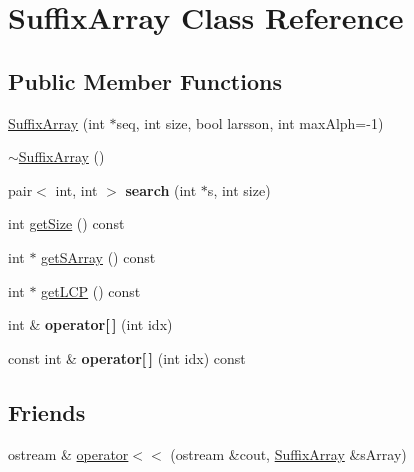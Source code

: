 \hypertarget{classSuffixArray}{\section{Suffix\-Array Class Reference}
\label{classSuffixArray}
}
\subsection*{Public Member Functions}
\begin{DoxyCompactItemize}
\item 
\hyperlink{classSuffixArray_a83235ab312aea1c50ab3a616c85ae405}{Suffix\-Array} (int $\ast$seq, int size, bool larsson, int max\-Alph=-\/1)
\item 
\hyperlink{classSuffixArray_a6493c8516e4b76cce6fe0bfca47b13b0}{$\sim$\-Suffix\-Array} ()
\item 
\hypertarget{classSuffixArray_a1886977617bfc4c9cb7d6c643ebb0696}{pair$<$ int, int $>$ {\bfseries search} (int $\ast$s, int size)}\label{classSuffixArray_a1886977617bfc4c9cb7d6c643ebb0696}

\item 
int \hyperlink{classSuffixArray_a42c1557b2ad51886208dcf74b200e276}{get\-Size} () const 
\item 
int $\ast$ \hyperlink{classSuffixArray_a9f702b7c059a694cad1c776dd90b637a}{get\-S\-Array} () const 
\item 
int $\ast$ \hyperlink{classSuffixArray_a4ec9f2035ee2a6ed06ccbba58165c7e2}{get\-L\-C\-P} () const 
\item 
\hypertarget{classSuffixArray_a3a714f4d1d641c769b75957ef4f6c083}{int \& {\bfseries operator\mbox{[}$\,$\mbox{]}} (int idx)}\label{classSuffixArray_a3a714f4d1d641c769b75957ef4f6c083}

\item 
\hypertarget{classSuffixArray_a4b20c30605bb5244ff8efb02f53686d8}{const int \& {\bfseries operator\mbox{[}$\,$\mbox{]}} (int idx) const }\label{classSuffixArray_a4b20c30605bb5244ff8efb02f53686d8}

\end{DoxyCompactItemize}
\subsection*{Friends}
\begin{DoxyCompactItemize}
\item 
ostream \& \hyperlink{classSuffixArray_a79797b488f2191d1fef54a6eb01dce3f}{operator$<$$<$} (ostream \&cout, \hyperlink{classSuffixArray}{Suffix\-Array} \&s\-Array)
\end{DoxyCompactItemize}


